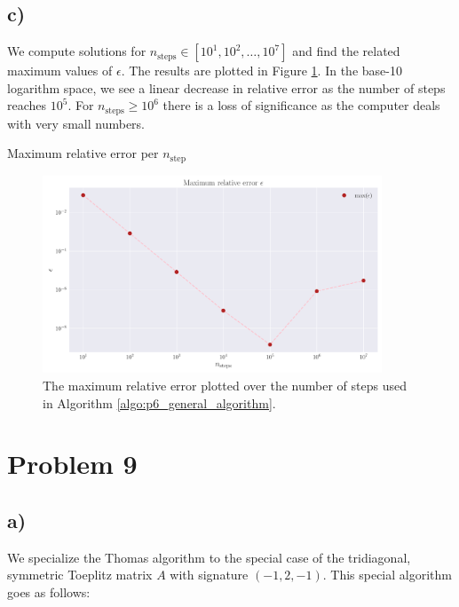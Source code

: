 \documentclass[english,notitlepage,nofootinbib]{revtex4-1}  %
\newcommand{\Fig}[1]{Figure \ref{fig:#1}}
\newcommand{\Algo}[1]{Algorithm \ref{algo:#1}}
\begin{document}
\subsection*{c)}
We compute solutions for $n_\text{steps}\in[10^1, 10^2, \dots, 10^7]$ and find the related maximum values of $\epsilon$. The results are plotted in \Fig{p8_max_rel_err}. In the base-10 logarithm space, we see a linear decrease in relative error as the number of steps reaches $10^5$. For $n_\text{steps}\geq 10^6$ there is a loss of significance as the computer deals with very small numbers.

\begin{table}
    \caption{Maximum relative error per $n_{\mathrm{step}}$}
    \label{tab:max_rel_error}  
    
\end{table}

\begin{figure}[h!]
    \centering
    \includegraphics[width=0.9\textwidth]{max_relative_error.pdf}
    \caption{The maximum relative error plotted over the number of steps used in \Algo{p6_general_algorithm}.}\label{fig:p8_max_rel_err}
\end{figure}

\section*{Problem 9}

\subsection*{a)}

We specialize the Thomas algorithm to the special case of the tridiagonal, symmetric Toeplitz matrix $A$ with signature $(-1,2,-1)$. This special algorithm goes as follows: 
\end{document}
